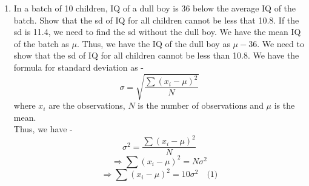 \begin{enumerate}
    We need to find the mean deviation around median for this distribution.
    We have the total number of observations as -
    \[N = 4 + 10 + 13 + 21 + 23 + 20 + 18 + 9 + 2 = 120\]
    We need to find the median of the distribution. Thus, we have -
    \[\frac{N}{2} = \frac{120}{2} = 60\]
    The median class is 4. Thus, we have -
    \[L = 4\]
    \[F = 4 + 10 + 13 + 21 = 48\]
    \[f = 23\]
    \[h = 1\]
    Thus, we have -
    \[ \text{Median} = 4 + \left(\frac{60 - 48}{23}\right) \cdot 1 = 4 + \frac{12}{23} = \frac{92 + 12}{23} = \frac{104}{23} \approx 4.52\]
    Now, we need to find the mean deviation around median. Thus, we have -
    \[MD = \frac{\sum f_i |x_i - \text{Median}|}{N}\]
    \begin{multline}
= \frac{4 \left|0 - \frac{104}{23}\right| + 10 \left|1 - \frac{104}{23}\right| + 13 \left|2 - \frac{104}{23}\right| + 21 \left|3 - \frac{104}{23}\right| + 23 \left|4 - \frac{104}{23}\right| + 20 \left|5 - \frac{104}{23}\right|}{120} \\ + \frac{18 \left|6 - \frac{104}{23}\right| + 9 \left|7 - \frac{104}{23}\right| + 2 \left|8 - \frac{104}{23}\right|}{120}
        \end{multline}
        \begin{multline}
= \frac{4 \cdot \frac{104}{23} + 10 \cdot \frac{81}{23} + 13 \cdot \frac{58}{23} + 21 \cdot \frac{35}{23} + 23 \cdot \frac{12}{23} + 20 \cdot \frac{19}{23} + 18 \cdot \frac{42}{23} + 9 \cdot \frac{65}{23} + 2 \cdot \frac{88}{23}}{120} \\
= \frac{\frac{416 + 810 + 754 + 735 + 276 + 380 + 756 + 585 + 176}{23}}{120} = \frac{\frac{4888}{23}}{120} = \frac{4888}{2760} = \frac{1222}{690} \approx 1.77
        \end{multline}
    \item In a batch of 10 children, IQ of a dull boy is 36 below the average IQ of the batch. Show that the sd of IQ for all children cannot be less that 10.8. If the sd is 11.4, we need to find the sd without the dull boy. 
    We have the mean IQ of the batch as $\mu$. Thus, we have the IQ of the dull boy as $\mu - 36$. We need to show that the sd of IQ for all children cannot be less than 10.8.
    We have the formula for standard deviation as -
    \[\sigma = \sqrt{\frac{\sum (x_i - \mu)^2}{N}}\]
    where $x_i$ are the observations, $N$ is the number of observations and $\mu$ is the mean. \\
    Thus, we have -
    \[\sigma^2 = \frac{\sum (x_i - \mu)^2
}{N}\]
    \[\Rightarrow \sum (x_i - \mu)^2 = N \sigma^2\]
    \[\Rightarrow \sum (x_i - \mu)^2 = 10 \sigma^2 \quad \text{(1)}\]

\end{enumerate}

